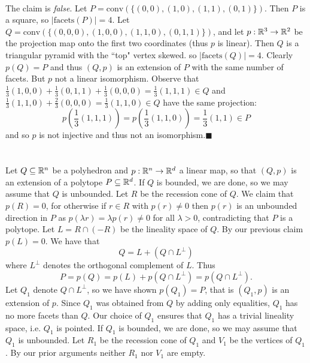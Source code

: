 \documentclass[letterpaper,12pt,oneside,onecolumn]{article}
\newcommand{\conv}[1]{\ensuremath{\text{conv}(#1) }}
\begin{document}
\paragraph{}
The claim is \emph{false}. Let $P = \conv{\{(0,0),(1,0),(1,1),(0,1)\}}$. Then $P$ is a square, so $|\text{facets}(P)| = 4$. Let $Q = \conv{\{(0,0,0),(1,0,0), (1,1,0), (0,1,1)\}}$, and let $p: \mathbb{R}^3\rightarrow \mathbb{R}^2$ be the projection map onto the first two coordinates (thus $p$ is linear). Then $Q$ is a triangular pyramid with the ``top" vertex skewed. so $|\text{facets}(Q)| = 4$. Clearly $p(Q) = P$ and thus $(Q,p)$ is an extension of $P$ with the same number of facets. But $p$ not a linear isomorphism. Observe that $\frac{1}{3}(1,0,0) + \frac{1}{3}(0,1,1) + \frac{1}{3}(0,0,0) = \frac{1}{3}(1,1,1) \in Q$ and $ \frac{1}{3}(1,1,0) + \frac{2}{3}(0,0,0) = \frac{1}{3}(1,1,0) \in Q$ have the same projection:
$$p(\frac{1}{3}(1,1,1)) = p(\frac{1}{3}(1,1,0)) = \frac{1}{3}(1,1) \in P$$
and so $p$ is not injective and thus not an isomorphism.$\blacksquare$
\section{}
\paragraph{}
Let $Q \subseteq \mathbb{R}^n$ be a polyhedron and $p:\mathbb{R}^n \rightarrow \mathbb{R}^d$ a linear map, so that $(Q,p)$ is an extension of a polytope $P \subseteq \mathbb{R}^d$. If $Q$ is bounded, we are done, so we may assume that $Q$ is unbounded. Let $R$ be the recession cone of $Q$. We claim that $p(R) = 0$, for otherwise if $r \in R$ with $p(r) \neq 0$ then $p(r)$ is an unbounded direction in $P$ as $p(\lambda r) = \lambda p(r) \neq 0$ for all $\lambda  > 0$, contradicting that $P$ is a polytope. Let $L = R \cap (-R)$ be the lineality space of $Q$. By our previous claim $p(L) = 0$. We have that
$$Q = L + (Q\cap L^\perp)$$
where $L^\perp$ denotes the orthogonal complement of $L$. Thus
$$P = p(Q) = p(L) + p(Q\cap L^\perp) = p(Q\cap L^\perp).$$
Let $Q_1$ denote $Q\cap L^\perp$, so we have shown $p(Q_1) = P$, that is $(Q_1, p)$ is an extension of $p$. Since $Q_1$ was obtained from $Q$ by adding only equalities, $Q_1$ has no more facets than $Q$. Our choice of $Q_1$ ensures that $Q_1$ has a trivial lineality space, i.e. $Q_1$ is pointed. If $Q_1$ is bounded, we are done, so we may assume that $Q_1$ is unbounded. Let $R_1$ be the recession cone of $Q_1$ and $V_1$ be the vertices of $Q_1$. By our prior arguments neither $R_1$ nor $V_1$ are empty.
\end{document}
